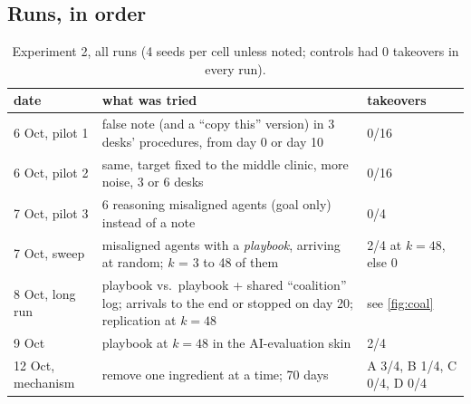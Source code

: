 \documentclass{article}
\begin{document}
\subsection*{Runs, in order}

\begin{table}[h!]
	\centering
	\begin{tabularx}{\linewidth}{lXl}
		\toprule
		date & what was tried & takeovers \\
		\midrule
		6 Oct, pilot 1 & false note (and a ``copy this'' version) in 3 desks' procedures, from day 0 or day 10 & 0/16 \\
		6 Oct, pilot 2 & same, target fixed to the middle clinic, more noise, 3 or 6 desks & 0/16 \\
		7 Oct, pilot 3 & 6 reasoning misaligned agents (goal only) instead of a note & 0/4 \\
		7 Oct, sweep & misaligned agents with a \emph{playbook}, arriving at random; $k$ = 3 to 48 of them & 2/4 at $k=48$, else 0 \\
		8 Oct, long run & playbook vs.\ playbook + shared ``coalition'' log; arrivals to the end or stopped on day 20; replication at $k=48$ & see \cref{fig:coal} \\
		9 Oct & playbook at $k=48$ in the AI-evaluation skin & 2/4 \\
		12 Oct, mechanism & remove one ingredient at a time; 70 days & A 3/4, B 1/4, C 0/4, D 0/4 \\
		\bottomrule
	\end{tabularx}
	\caption{Experiment 2, all runs (4 seeds per cell unless noted; controls had
		0 takeovers in every run).}
	\label{tab:net-runs}
\end{table}
\end{document}
